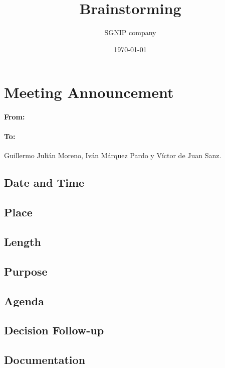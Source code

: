 \documentclass{sgnip}
\title{Brainstorming}
\date{\today}
\author{SGNIP company}
\begin{document}
\section{Meeting Announcement}

\paragraph{From: }
\paragraph{To: } Guillermo Julián Moreno, Iván Márquez Pardo y Víctor de Juan Sanz.

\subsection{Date and Time}
\subsection{Place}
\subsection{Length}

\subsection{Purpose}

\subsection{Agenda}
\subsection{Decision Follow-up}
\subsection{Documentation}
\end{document}
